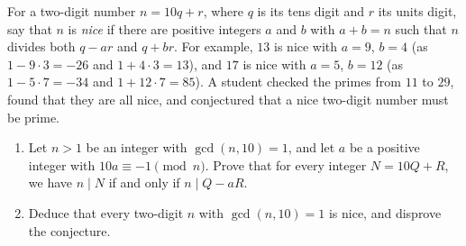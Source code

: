 For a two-digit number $n=10q+r$, where $q$ is its tens digit and $r$ its units digit, say that $n$ is \emph{nice} if there are positive integers $a$ and $b$ with $a+b=n$ such that $n$ divides both $q-ar$ and $q+br$. For example, $13$ is nice with $a=9$, $b=4$ (as $1-9\cdot3=-26$ and $1+4\cdot3=13$), and $17$ is nice with $a=5$, $b=12$ (as $1-5\cdot7=-34$ and $1+12\cdot7=85$). A student checked the primes from $11$ to $29$, found that they are all nice, and conjectured that a nice two-digit number must be prime.
\begin{enumerate}
\item[(a)] Let $n>1$ be an integer with $\gcd(n,10)=1$, and let $a$ be a positive integer with $10a\equiv-1\pmod n$. Prove that for every integer $N=10Q+R$, we have $n\mid N$ if and only if $n\mid Q-aR$.
\item[(b)] Deduce that every two-digit $n$ with $\gcd(n,10)=1$ is nice, and disprove the conjecture.
\end{enumerate}
